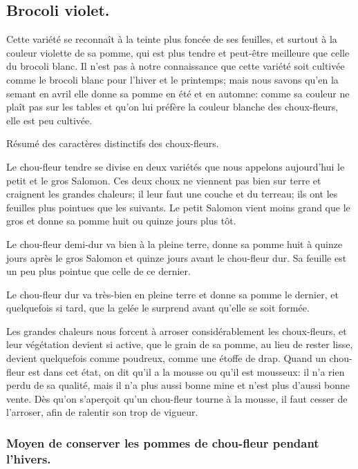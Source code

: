 \documentclass[10pt,a4paper]{book}
\begin{document}
\subsection{Brocoli violet.}

Cette variété se reconnaît à la teinte plus foncée de ses feuilles, et surtout à la couleur violette de sa pomme, qui est plus tendre et peut-être meilleure que celle du brocoli blanc. Il n'est pas à notre connaissance que cette variété soit cultivée comme le brocoli blanc pour l'hiver et le printemps; mais nous savons qu'en la semant en avril elle donne sa pomme en été et en automne: comme sa couleur ne plaît pas sur les tables et qu'on lui préfère la couleur blanche des choux-fleurs, elle est peu cultivée.

Résumé des caractères distinctifs des choux-fleurs.

Le chou-fleur tendre se divise en deux variétés que nous appelons aujourd'hui le petit et le gros Salomon. Ces deux choux ne viennent pas bien sur terre et craignent les grandes chaleurs; il leur faut une couche et du terreau; ils ont les feuilles plus pointues que les suivants. Le petit Salomon vient moins grand que le gros et donne sa pomme huit ou quinze jours plus tôt.

Le chou-fleur demi-dur va bien à la pleine terre, donne sa pomme huit à quinze jours après le gros Salomon et quinze jours avant le chou-fleur dur. Sa feuille est un peu plus pointue que celle de ce dernier.

Le chou-fleur dur va très-bien en pleine terre et donne sa pomme le dernier, et quelquefois si tard, que la gelée le surprend avant qu'elle se soit formée.

Les grandes chaleurs nous forcent à arroser considérablement les choux-fleurs, et leur végétation devient si active, que le grain de sa pomme, au lieu de rester lisse, devient quelquefois comme poudreux, comme une étoffe de drap. Quand un chou-fleur est dans cet état, on dit qu'il a la mousse ou qu'il est mousseux: il n'a rien perdu de sa qualité, mais il n'a plus aussi bonne mine et n'est plus d'aussi bonne vente. Dès qu'on s'aperçoit qu'un chou-fleur tourne à la mousse, il faut cesser de l'arroser, afin de ralentir son trop de vigueur.

\subsubsection{Moyen de conserver les pommes de chou-fleur pendant l'hivers.}\label{conserverchoufleur} 
\end{document}
